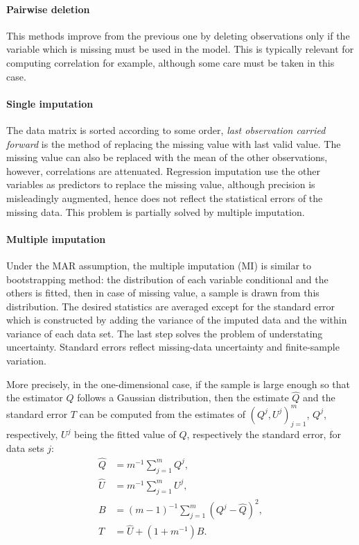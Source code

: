 \paragraph{Pairwise deletion}

This methods improve from the previous one by deleting observations only if the
variable which is missing must be used in the model. This is typically relevant
for computing correlation for example, although some care must be taken in this
case.

\paragraph{Single imputation}

The data matrix is sorted according to some order, \emph{last observation
  carried forward} is the method of replacing the missing value with last valid
value. The missing value can also be replaced with the mean of the other
observations, however, correlations are attenuated. Regression imputation use
the other variables as predictors to replace the missing value, although
precision is misleadingly augmented, hence does not reflect the statistical
errors of the missing data. This problem is partially solved by multiple
imputation.

\paragraph{Multiple imputation}

Under the MAR assumption, the multiple imputation (MI) is similar to
bootstrapping method: the distribution of each variable conditional and the
others is fitted, then in case of missing value, a sample is drawn from this
distribution. The desired statistics are averaged except for the standard error
which is constructed by adding the variance of the imputed data and the within
variance of each data set. The last step solves the problem of understating
uncertainty. Standard errors reflect missing-data uncertainty and finite-sample
variation.

More precisely, in the one-dimensional case, if the sample is large enough so
that the estimator $Q$ follows a Gaussian distribution, then the estimate
$\hat Q$ and the standard error $T$ can be computed from the estimates of
$(Q^j, U^j)_{j=1}^m$, $Q^j$, respectively, $U^j$ being the fitted value of $Q$,
respectively the standard error, for data sets $j$:
\begin{align*}
  \hat Q & = m^{-1} \sum_{j=1}^m Q^j, \\
  \hat U & = m^{-1} \sum_{j=1}^m U^j, \\
  B & = (m-1)^{-1}\sum_{j=1}^m(Q^j - \hat Q)^2, \\
  T & = \hat U + (1 + m^{-1}) B.
\end{align*}

